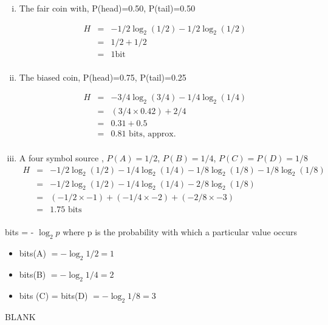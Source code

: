 \documentclass[a4paper,12pt]{article}
\begin{document}
\begin{enumerate}[(i)]
\item The fair coin with, P(head)=0.50, P(tail)=0.50 


\begin{eqnarray*}
H &=& -1/2 \log_2(1/2) - 1/2\log_2(1/2) \\
&=& 1/2 + 1/2 \\
&=& 1 \mbox{bit} \\
\end{eqnarray*}

\item The biased coin, P(head)=0.75, P(tail)=0.25 

\begin{eqnarray*}
H &=& - 3/4 \log_2(3/4) - 1/4 \log_2(1/4) \\
&=& (3/4\times0.42) + 2/4 \\
&=& 0.31 + 0.5 \\
&=& 0.81 \mbox{ bits, approx.} \\
\end{eqnarray*}

\item A four symbol source , $P(A)=1/2$, $P(B)=1/4$, $P(C)=P(D)=1/8$ 
\begin{eqnarray*}
H &=& - 1/2 \log_2(1/2) - 1/4\log_2(1/4) - 1/8 \log_2(1/8) - 1/8 \log_2(1/8) \\
&=& - 1/2 \log_2(1/2) - 1/4\log_2(1/4) - 2/8 \log_2(1/8)  \\
&=& (- 1/2 \times -1) + (- 1/4  \times -2) + ( - 2/8  \times -3)  \\
&=& 1.75 \mbox{ bits} \\
\end{eqnarray*}

\end{enumerate}
\noindent bits = - $\log_2 p$  where p is the probability with which a particular value occurs

\begin{itemize}
\item  bits(A) $= - \log_2 1/2 = 1$
\item  bits(B) $= - \log_2 1/4 = 2$
\item  bits (C) = bits(D) $= - \log_2 1/8 = 3$
\end{itemize}

\newpage
BLANK
\end{document}

